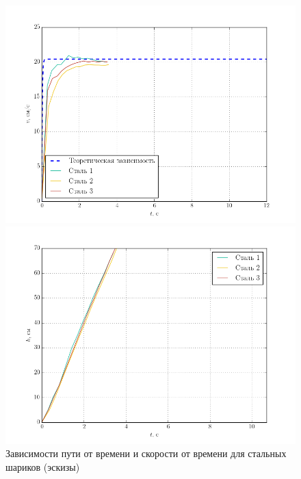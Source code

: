 \documentclass[a4paper,12pt]{article}
\begin{document}
\begin{figure}[H]
		\begin{minipage}[c]{0.49\textwidth}
			\includegraphics[width=1\textwidth]{img/steel123.png}
		\end{minipage}	
		\begin{minipage}[c]{0.49\textwidth}
			\centering
			\includegraphics[width=1\textwidth]{img/steel123-s.png}
		\end{minipage}		
	\caption{Зависимости пути от времени и скорости от времени для стальных шариков (эскизы)}
	\label{fig:figure1}
\end{figure}
\end{document}
